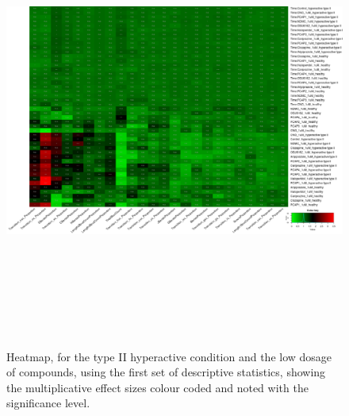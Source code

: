 \documentclass[a4paper,12pt]{article}
\begin{document}
\begin{figure}[h!]
\begin{center}
\includegraphics[width=16cm,height=15cm]{DarkPTZ_heatmap_1_microM_DarkPTZ_B2MAP.png}
\caption{Heatmap, for the type II hyperactive condition and the low dosage of compounds, using the first set of descriptive statistics, showing the multiplicative effect sizes colour coded and noted with the significance level.}
\end{center}
\end{figure}
\newpage
\end{document}
